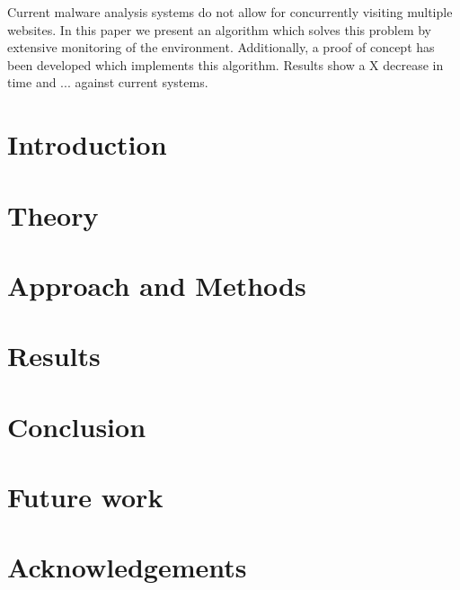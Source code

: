 \documentclass{scrartcl}
\begin{document}
Current malware analysis systems do not allow for concurrently visiting multiple websites. In this paper we present an algorithm which solves this problem by extensive monitoring of the environment. Additionally, a proof of concept has been developed which implements this algorithm. Results show a X decrease in time and ... against current systems.

\clearpage

\tableofcontents

\clearpage


\section{Introduction}


\clearpage

\section{Theory}


\clearpage

\section{Approach and Methods}


\clearpage

\section{Results}


\clearpage

\section{Conclusion}


\clearpage

\section{Future work}


\clearpage

\section*{Acknowledgements}
\end{document}
